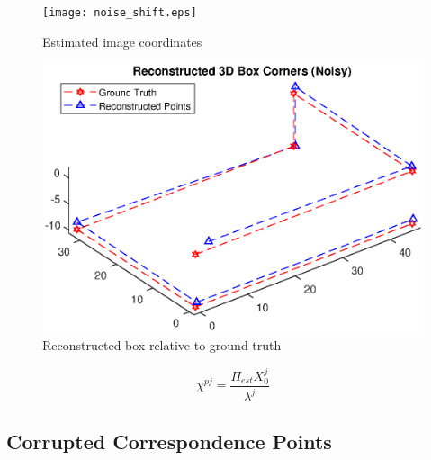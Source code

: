 \documentclass[12pt]{article}
\begin{document}
	\begin{figure}[h]
	\centering %
	\captionsetup{justification=centering}
	\begin{minipage}{0.5\textwidth}
		\centering
		\texttt{[image: noise\_shift.eps]}
		\caption{Estimated image coordinates} \label{noiseshift}
	\end{minipage}\hfill
	\begin{minipage}{0.5\textwidth}
		\centering %
		\includegraphics[width=1\textwidth]{noise_shift_recon.eps}
		\caption{Reconstructed box relative to ground truth} \label{noiserecon}
	\end{minipage}
\end{figure}

\begin{equation}\label{xp}
	\chi^{pj} = \dfrac{\Pi_{est} X_0^j}{\lambda^j}
\end{equation}

\subsection{Corrupted Correspondence Points}
\end{document}
